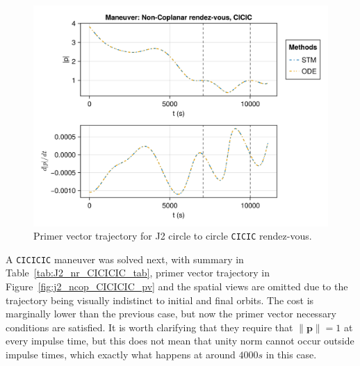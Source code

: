 \begin{figure}[htbp]
    \centering
    \includegraphics[width=\linewidth]{../results/j2/ipv_noncop/CICIC_primer_vector.png}
    \caption{Primer vector trajectory for J2 circle to circle \texttt{CICIC} rendez-vous.}
    \label{fig:j2_ncop_CICIC_pv}
\end{figure}

A \texttt{CICICIC} maneuver was solved next, with summary in Table~\ref{tab:J2_nr_CICICIC_tab}, primer vector trajectory in Figure~\ref{fig:j2_ncop_CICICIC_pv} and the spatial views are omitted due to the trajectory being visually indistinct to initial and final orbits. The cost is marginally lower than the previous case, but now the primer vector necessary conditions are satisfied. It is worth clarifying that they require that \(\lVert \mathbf{p} \rVert = 1\) at every impulse time, but this does not mean that unity norm cannot occur outside impulse times, which exactly what happens at around \(4000 s\) in this case. 

